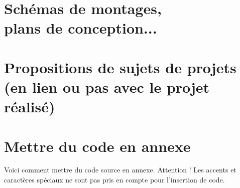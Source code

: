 \documentclass[a4paper, 12pt]{report} %
\begin{document}
	\chapter{Schémas de montages, \\plans de conception...}
	\chapter{Propositions de sujets de projets \\ (en lien ou pas avec le projet réalisé)}
	\chapter{Mettre du code en annexe}

	Voici comment mettre du code source en annexe. Attention ! Les accents et caractères spéciaux ne sont pas pris en compte pour l'insertion de code.
\end{document}
